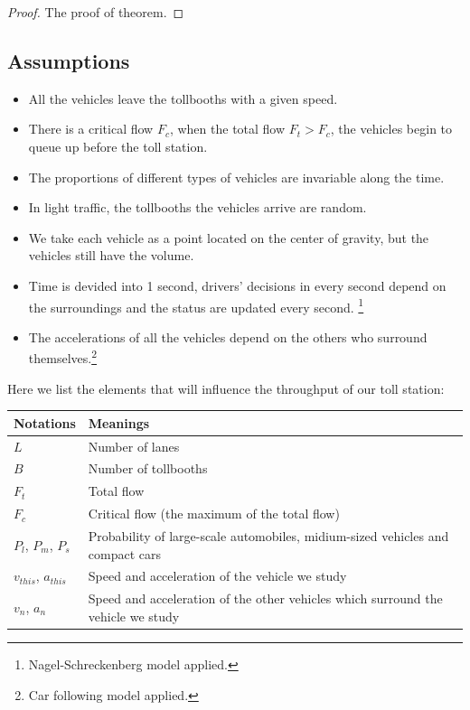 \documentclass{mcmthesis}
\begin{document}
\begin{proof}
The proof of theorem.
\end{proof}

\subsection{Assumptions}

\begin{itemize}
	\item All the vehicles leave the tollbooths with a given speed.
	\item There is a critical flow $F_c$, when the total flow  $F_t>F_c$, the vehicles begin to queue up before the toll station.
	\item The proportions of different types of vehicles are invariable along the time.
	\item In light traffic, the tollbooths the vehicles arrive are random.
	\item We take each vehicle as a point located on the center of gravity, but the vehicles still have the volume.
    \item Time is devided into 1 second, drivers' decisions in every second depend on the surroundings and the status are updated every second. \footnote{Nagel-Schreckenberg model applied.}
	\item The accelerations of all the vehicles depend on the others who surround themselves.\footnote{Car following model applied.}
\end{itemize}



Here we list the elements that will influence the throughput of our toll station:

\begin{tabular}{|m{7cm}<{\centering}|p{7cm}<{\centering}|}
	\hline
	Notations & Meanings \\
	\hline
	 $L$ &  Number of lanes \\
	\hline
	 $B$ &  Number of tollbooths\\
	 \hline
     $F_t$ & 	 Total flow\\
     \hline
     $F_c$ & Critical flow (the maximum of the total flow)\\
     \hline
     $P_l$,  $P_m$, $P_s$ & Probability of large-scale automobiles, midium-sized vehicles and compact cars\\
     \hline
     $v_{this}$, $a_{this}$ & Speed and acceleration of the vehicle we study\\
     \hline
      $v_n$, $a_n$ &  Speed and acceleration of the other vehicles which surround the vehicle we study\\
   \hline
     
\end{tabular}
\end{document}
